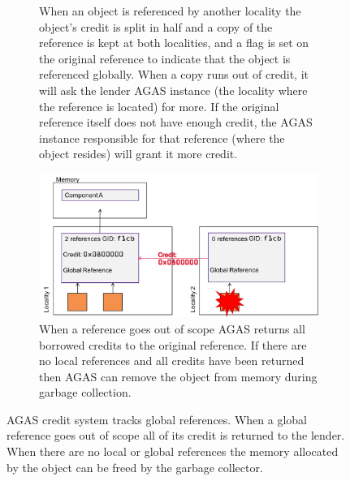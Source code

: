 \begin{enumerate}
\begin{figure}[t]
\begin{subfigure}[t]{0.49\textwidth}
                \caption{When an object is referenced by another locality the object's
                  credit is split in half and a copy of the reference is kept at both
                  localities, and a flag is set on the original reference to
                  indicate that the object is referenced globally. When a copy
                  runs out of credit, it will ask the lender AGAS instance (the
                  locality where the reference is located) for more. If the
                  original reference itself does not have enough credit, the
                  AGAS instance responsible for that reference (where the
                  object resides) will grant it more credit.
                }
                \label{fig:agas_credit_3}
            \end{subfigure}
            \hfill
            \begin{subfigure}[t]{0.49\textwidth}
                \includegraphics[width=\textwidth]{illustrations/reference_counting_4}
                \caption{When a reference goes out of scope AGAS returns all borrowed
                  credits to the original reference. If there are no local references and all credits have been
                  returned then AGAS can remove the object from memory during garbage
                  collection.}
                \label{fig:agas_credit_4}
            \end{subfigure}
            \caption{AGAS credit system tracks global references. When a global reference goes out of scope all of its credit is returned to the lender. When there are no local or global references the memory allocated by the object can be freed by the garbage collector.}
            \label{fig:agas_credit}
        \end{figure}
\end{enumerate}

